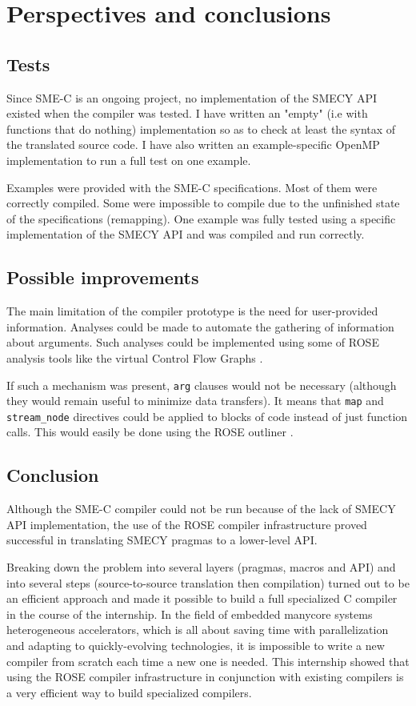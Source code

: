 \documentclass[a4paper]{article}
\begin{document}
\section{Perspectives and conclusions}
	\subsection{Tests}
	Since SME-C is an ongoing project, no implementation of the SMECY API existed when the compiler was tested. I have written an "empty" (i.e with functions that do nothing) implementation so as to check at least the syntax of the translated source code. I have also written an example-specific OpenMP implementation to run a full test on one example.
	
	Examples were provided with the SME-C specifications. Most of them were correctly compiled. Some were impossible to compile due to the unfinished state of the specifications (remapping). One example was fully tested using a specific implementation of the SMECY API and was compiled and run correctly.
	
	\subsection{Possible improvements}
	The main limitation of the compiler prototype is the need for user-provided information. Analyses could be made to automate the gathering of information about arguments. Such analyses could be implemented using some of ROSE analysis tools like the virtual Control Flow Graphs \cite{tuto}.
	
	If such a mechanism was present, \verb+arg+ clauses would not be necessary (although they would remain useful to minimize data transfers). It means that \verb+map+ and \verb+stream_node+ directives could be applied to blocks of code instead of just function calls. This would easily be done using the ROSE outliner \cite{tuto,outliner}.
	
	\subsection{Conclusion}
	Although the SME-C compiler could not be run because of the lack of
    SMECY API implementation, the use of the ROSE compiler infrastructure
    proved successful in translating SMECY pragmas to a lower-level
    API.
    
    Breaking down the problem into several layers (pragmas, macros
    and API) and into several steps (source-to-source translation then compilation) turned out to be an efficient approach and made it possible to build a full specialized C compiler in the course of the internship.
    In the field of embedded manycore systems heterogeneous accelerators, which is all about saving time with parallelization and adapting to quickly-evolving technologies, it is impossible to write a new compiler from scratch each time a new one is needed. This internship showed that using the ROSE compiler infrastructure in conjunction with existing compilers is a very efficient way to build specialized compilers.
	
\end{document}
